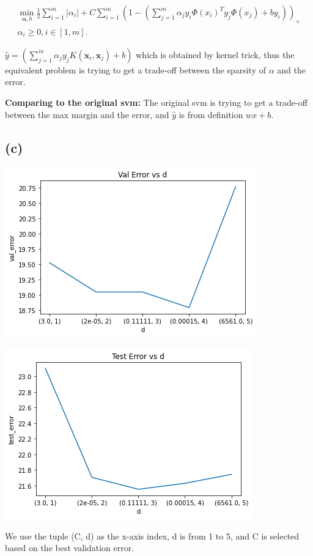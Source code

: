 \documentclass{article}
\begin{document}
\begin{equation}
    \begin{aligned}
        \min _{\boldsymbol{\alpha}, b} \frac{1}{2} \sum_{i=1}^{m}\left|\alpha_{i}\right|+C \sum_{i=1}^{m}
        \left(
        1 -
        \left(
            \sum_{j=1}^{m}
            \alpha_{j}
            y_i \Phi(x_i)^T y_{j} \Phi(x_j)
            +b y_i
            \right)
        \right)_+
        \\
        \alpha_{i} \geq 0, i \in[1, m] .
    \end{aligned}
\end{equation}

$ \hat{y} =\left(\sum_{j=1}^{m} \alpha_{j} y_{j} K\left(\boldsymbol{x}_{i}, \boldsymbol{x}_{j}\right)+b\right)$ which is obtained by kernel trick, thus the equivalent problem is trying to get a trade-off between the sparsity of $\alpha$ and the error.

\textbf{Comparing to the original svm:}
The original svm is trying to get a trade-off between the max margin and the error, and $\hat{y}$ is from definition $wx+b$.

\subsection*{(c)}

\includegraphics[width=\linewidth]{./images/C6_val_error_vs_d.png}

\includegraphics[width=\linewidth]{./images/C6_test_error_vs_d.png}

We use the tuple (C, d) as the x-axis index, d is from 1 to 5, and C is selected based on the best validation error.


\newpage



\nocite*{}
\end{document}
